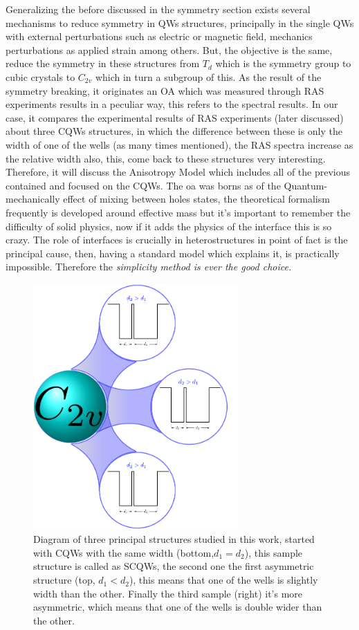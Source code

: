 Generalizing the before discussed in the symmetry section exists several mechanisms to reduce symmetry in QWs structures, principally in the single QWs with external perturbations such as electric or magnetic field, mechanics perturbations as applied strain among others.  But, the objective is the same, reduce the symmetry in these structures from  $T_{d}$ which is the symmetry group to cubic crystals to $C_{2v}$ which in turn a  subgroup of this. As the result of the symmetry breaking,  it originates an OA which was measured through \gls{RAS} experiments results in a peculiar way, this refers to the spectral results. In our case, it compares the experimental results of \gls{RAS} experiments (later discussed) about three CQWs structures, in which the difference between these is only the width of one of the wells (as many times mentioned), the \gls{RAS} spectra increase as the relative width also,  this, come back to these structures very interesting.  Therefore, it will discuss the Anisotropy Model which includes all of the previous contained and focused on the CQWs. The \gls{oa} was borns as of the Quantum-mechanically effect of mixing between holes states, the theoretical formalism frequently is developed around effective mass but it's important to remember the difficulty of solid physics, now if it adds the physics of the interface this is so crazy. The role of interfaces is crucially in heterostructures in point of fact is the principal cause, then, having a standard model which explains it, is practically impossible. Therefore the \emph{simplicity method is ever the good choice.}
\begin{figure}[H]
	\centering
	\includegraphics[width=0.7\textwidth]{../figures/chapter-2/model/out/model-scheme}
	\caption{Diagram of three principal structures studied in this work, started with CQWs with the same width (bottom,$d_{1}=d_{2}$), this sample structure is called as SCQWs, the second one the first asymmetric structure (top, $d_{1}<d_{2}$), this means that one of the wells is slightly width than the other. Finally the third sample (right) it's more asymmetric, which means that one of the wells is double wider than the other.    }
	\label{fig:chapter-2-anisotropy-model-samples-studied}
\end{figure}
